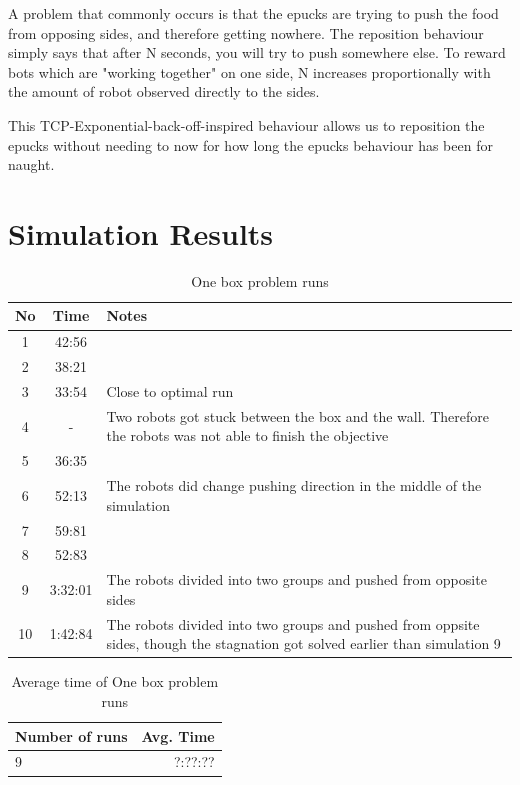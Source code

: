 \documentclass[a4paper]{article}
\begin{document}
A problem that commonly occurs is that the epucks are trying to push the food from opposing sides, and therefore getting nowhere. The reposition behaviour simply says that after N seconds, you will try to push somewhere else. To reward bots which are "working together" on one side, N increases proportionally with the amount of robot observed directly to the sides. 

This TCP-Exponential-back-off-inspired behaviour allows us to reposition the epucks without needing to now for how long the epucks behaviour has been for naught.

\section{Simulation Results}
\begin{table}[H]
\centering
\begin{tabular}{ c | c | p{5cm}}
\hline No & Time & Notes \\ \hline
 1 & 42:56 &  \\ \hline
 2 & 38:21 & \\ \hline
 3 & 33:54 & Close to optimal run \\ \hline
4 & - & Two robots got stuck between the box and the wall. Therefore the robots was not able to finish the objective \\ \hline
5 & 36:35 & \\ \hline
6	& 52:13 & The robots did change pushing direction in the middle of the simulation \\ \hline
7 & 59:81 & \\ \hline
8 & 52:83 & \\ \hline
9 & 3:32:01 &  The robots divided into two groups and pushed from opposite sides \\ \hline
10 & 1:42:84 & The robots divided into two groups and pushed from oppsite sides, though the stagnation got solved earlier than simulation 9 \\
\end{tabular}
\caption{One box problem runs}
\end{table}


\begin{table}
\centering
\begin{tabular}{ l | r}
\hline Number of runs & Avg. Time \\ \hline
9 & ?:??:?? \\
\end{tabular}
\caption{ Average time of One box problem runs}
\end{table}
\end{document}
